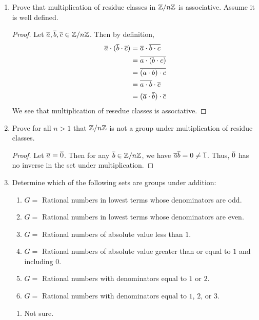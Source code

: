 \begin{enumerate}
\begin{proof}
\begin{align*}
					&=(\res{a}+\res{b})+\res{c}
				\end{align*}
				We see that addition of resedue classes is associative.
			\end{proof}
		\item Prove that multiplication of residue classes in $\mathbb{Z}/n\mathbb{Z}$ is associative.  Assume it is well defined.
			\begin{proof}
				Let $\overline{a}, \overline{b}, \overline{c} \in \mathbb{Z}/n\mathbb{Z}$.  Then by definition,
				\begin{align*}
				\overline{a} \cdot (\overline{b} \cdot \overline{c}) & = \overline{a} \cdot \overline{b\cdot c}\\
				&=\overline{a\cdot(b\cdot c)}\\
				&=\overline{(a\cdot b)\cdot c}\\
				&=\overline{a\cdot b} \cdot \overline{c}\\
				&=(\overline{a}\cdot\overline{b})\cdot\overline{c}
				\end{align*}
				We see that multiplication of resedue classes is associative.
			\end{proof}
		\item Prove for all $n>1$ that $\mathbb{Z}/n\mathbb{Z}$ is not a group under multiplication of residue classes.
			\begin{proof}
				Let $\overline{a} = \overline{0}$.  Then for any $\overline{b}\in\mathbb{Z}/n\mathbb{Z}$, we have $\overline{a}\overline{b} = 0\neq \overline{1}$.  Thus, $\overline{0}$ has no inverse in the set under multiplication.
			\end{proof}
		\item Determine which of the following sets are groups under addition:
		\begin{enumerate}
			\item $G=$ Rational numbers in lowest terms whose denominators are odd.
			\item $G=$ Rational numbers in lowest terms whose denominators are even.
			\item $G=$ Rational numbers of absolute value less than $1$.
			\item $G=$ Rational numbers of absolute value greater than or equal to $1$ and including $0$.
			\item $G=$ Rational numbers with denominators equal to $1$ or $2$.
			\item $G=$ Rational numbers with denominators equal to $1$, $2$, or $3$.
		\end{enumerate}
		\begin{sln}
			\begin{enumerate}
				\item Not sure.
				

\end{enumerate}
\end{sln}
\end{enumerate}
